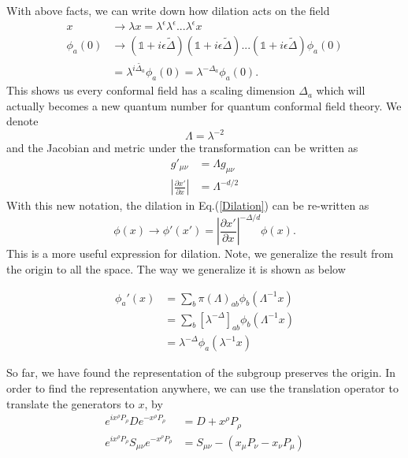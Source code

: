 \documentclass[a4paper,11pt]{article}
\begin{document}
With above facts, we can write down how dilation acts on the field
\begin{equation}
\begin{aligned}
x&\rightarrow\lambda x=\lambda^\epsilon\lambda^\epsilon...\lambda^\epsilon x\\
\phi_a (0)&\rightarrow(\mathds{1}+i\epsilon\tilde{\Delta})(\mathds{1}+i\epsilon\tilde{\Delta})...(\mathds{1}+i\epsilon\tilde{\Delta})\phi_a(0)\\
&=\lambda^{i\tilde{\Delta_a}}\phi_a(0)=\lambda^{-\Delta_a}\phi_a(0).
\label{Dilation}
\end{aligned}
\end{equation}
This shows us every conformal field has a scaling dimension $\Delta_a$ which will actually becomes a new quantum number for quantum conformal field theory. We denote
\begin{equation}
    \Lambda=\lambda^{-2}
\end{equation}
and the Jacobian and metric under the transformation can be written as 
\begin{equation}
\begin{aligned}
g'_{\mu\nu}&=\Lambda g_{\mu\nu}\\
\left|\frac{\partial x'}{\partial x}\right|&=\Lambda^{-d/2}
\end{aligned}
\end{equation}
With this new notation, the dilation in Eq.(\ref{Dilation}) can be re-written as
\begin{equation}
    \phi(x)\rightarrow\phi'(x')=\left|\frac{\partial x'}{\partial x}\right|^{-\Delta/d}\phi(x).
\end{equation}
This is a more useful expression for dilation. Note, we generalize the result from the origin to all the space. The way we generalize it is shown as below
\begin{framed}
\begin{equation}
\begin{aligned}
    \phi_a'(x)&=\sum_b\pi(\Lambda)_{ab}\phi_b(\Lambda^{-1}x)\\
    &=\sum_b[\lambda^{-\Delta}]_{ab}\phi_b(\Lambda^{-1}x)\\
    &=\lambda^{-\Delta}\phi_a(\lambda^{-1}x)
\end{aligned}    
\end{equation}
\end{framed}

So far, we have found the representation of the subgroup preserves the origin. In order to find the representation anywhere, we can use the translation operator to translate the generators to $x$, by
\begin{equation}
\begin{aligned}
    e^{ix^\rho P_\rho}De^{-x^\rho P_\rho}&=D+x^\rho P_\rho\\
    e^{ix^\rho P_\rho}S_{\mu\nu}e^{-x^\rho P_\rho}&=S_{\mu\nu}-(x_\mu P_\nu-x_\nu P_\mu)
\end{aligned}
\end{equation}
\end{document}
